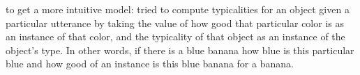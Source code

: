 \documentclass[10pt,letterpaper]{article}
\begin{document}
to get a more intuitive model: tried to compute typicalities for an object given a particular utterance by taking the value of how good that particular color is as an instance of that color, and the typicality of that object as an instance of the object's type. In other words, if there is a blue banana how blue is this particular blue and how good of an instance is this blue banana for a banana.


\end{document}
